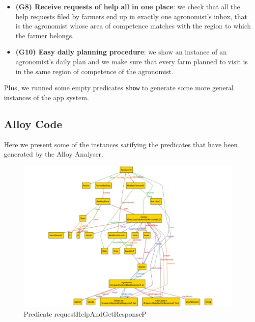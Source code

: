 \documentclass[table, 12pt]{article}
\begin{document}
\begin{itemize}
    \item \textbf{(G8) Receive requests of help all in one place}: we check that all the help requests filed by farmers end up in exactly one agronomist's inbox, that is the agronomist whose area of competence matches with the region to which the farmer belongs.
    \item \textbf{(G10) Easy daily planning procedure}: we show an instance of an agronomist's daily plan and we make sure that every farm planned to visit is in the same region of competence of the agronomist.
\end{itemize}

Plus, we runned some empty predicates \texttt{show} to generate some more general instances of the app system.

\subsection{Alloy Code}



Here we present some of the instances satifying the predicates that have been generated by the Alloy Analyser.

\begin{center}
    \begin{figure}[H]
        \includegraphics[scale=0.40, center]{assets/AlloyInstances/helpRequests.png}
        \caption{Predicate requestHelpAndGetResponseP}
        \label{fig: helpRequestAlloy}
    \end{figure}
\end{center}
\end{document}
